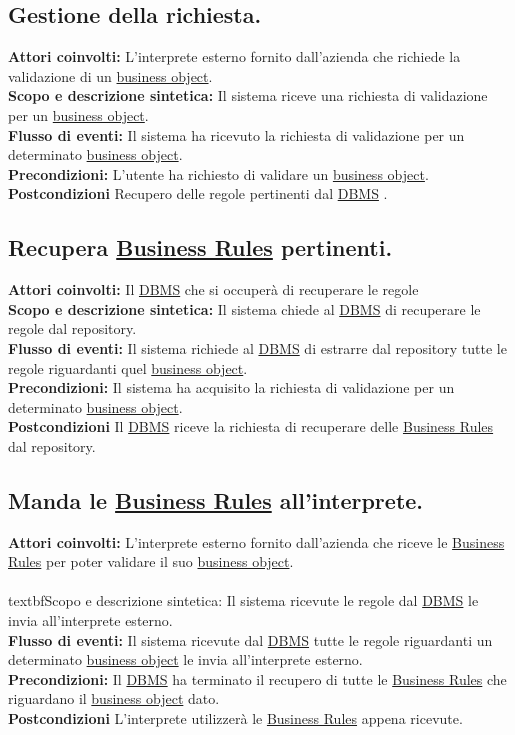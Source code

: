 \subsection{Gestione della richiesta.}
\textbf{Attori coinvolti:} L'interprete esterno fornito dall'azienda che richiede la validazione di un \underline{business object}.\\
\textbf{Scopo e descrizione sintetica:} Il sistema riceve una richiesta di validazione per un \underline{business object}.\\
\textbf{Flusso di eventi:} Il sistema ha ricevuto la richiesta di validazione per un determinato \underline{business object}.\\
\textbf{Precondizioni:} L'utente ha richiesto di validare un \underline{business object}.\\
\textbf{Postcondizioni} Recupero delle regole pertinenti dal \underline{DBMS} .

\subsection{Recupera \underline{Business Rules} pertinenti.}
\textbf{Attori coinvolti:} Il \underline{DBMS} che si occuper\`a di recuperare le regole\\
\textbf{Scopo e descrizione sintetica:} Il sistema chiede al \underline{DBMS} di recuperare le regole dal repository.\\
\textbf{Flusso di eventi:} Il sistema richiede al \underline{DBMS} di estrarre dal repository tutte le regole riguardanti quel \underline{business object}.\\
\textbf{Precondizioni:} Il sistema ha acquisito la richiesta di validazione per un determinato \underline{business object}.\\
\textbf{Postcondizioni} Il \underline{DBMS} riceve la richiesta di recuperare delle \underline{Business Rules} dal repository.
\subsection{Manda le \underline{Business Rules} all'interprete.}
\textbf{Attori coinvolti:} L'interprete esterno fornito dall'azienda che riceve le \underline{Business Rules} per poter validare il suo \underline{business object}.\\
\\textbf{Scopo e descrizione sintetica:} Il sistema ricevute le regole dal \underline{DBMS} le invia all'interprete esterno.\\
\textbf{Flusso di eventi:} Il sistema ricevute dal \underline{DBMS} tutte le regole riguardanti un determinato \underline{business object} le invia all'interprete esterno.\\
\textbf{Precondizioni:} Il \underline{DBMS} ha terminato il recupero di tutte le \underline{Business Rules} che riguardano il \underline{business object} dato.\\
\textbf{Postcondizioni} L'interprete utilizzer\`a le \underline{Business Rules} appena ricevute.

